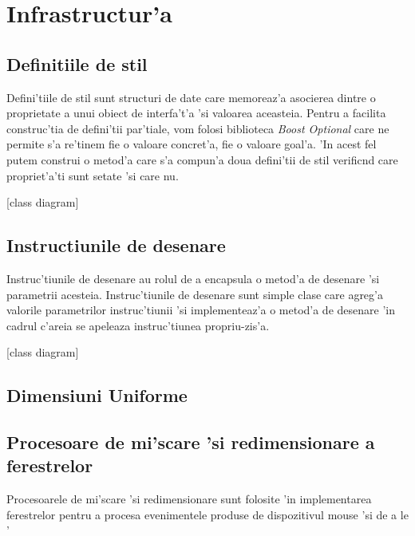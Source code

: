 
\section{Infrastructur'a}

\subsection{Definitiile de stil}

Defini'tiile de stil sunt structuri de date care memoreaz'a asocierea dintre o proprietate a unui obiect de interfa't'a 'si valoarea aceasteia. Pentru a facilita construc'tia de defini'tii par'tiale, vom folosi biblioteca \emph{Boost Optional} care ne permite s'a re'tinem fie o valoare concret'a, fie o valoare goal'a. 'In acest fel putem construi o metod'a care s'a compun'a doua defini'tii de stil verific{\ia}nd care propriet'a'ti sunt setate 'si care nu.

[class diagram]

\subsection{Instructiunile de desenare}

Instruc'tiunile de desenare au rolul de a encapsula o metod'a de desenare 'si parametrii acesteia. Instruc'tiunile de desenare sunt simple clase care agreg'a valorile parametrilor instruc'tiunii 'si implementeaz'a o metod'a de desenare 'in cadrul c'areia se apeleaza instruc'tiunea propriu-zis'a.

[class diagram]

\subsection{Dimensiuni Uniforme}



\subsection{Procesoare de mi'scare 'si redimensionare a ferestrelor}

Procesoarele de mi'scare 'si redimensionare sunt folosite 'in implementarea ferestrelor pentru a procesa evenimentele produse de dispozitivul mouse 'si de a le '

